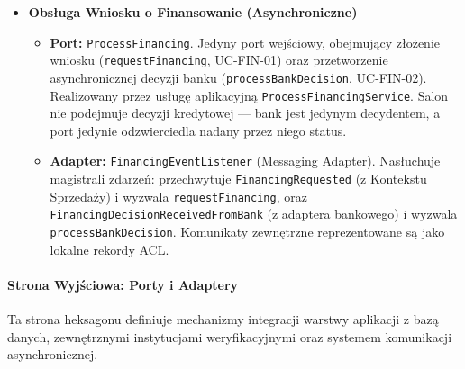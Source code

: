 \begin{itemize}
    \item \textbf{Obsługa Wniosku o Finansowanie (Asynchroniczne)}
    \begin{itemize}
        \item \textbf{Port:} \texttt{ProcessFinancing}. Jedyny port wejściowy, obejmujący złożenie wniosku (\texttt{requestFinancing}, UC-FIN-01) oraz przetworzenie asynchronicznej decyzji banku (\texttt{processBankDecision}, UC-FIN-02). Realizowany przez usługę aplikacyjną \texttt{ProcessFinancingService}. Salon nie podejmuje decyzji kredytowej — bank jest jedynym decydentem, a port jedynie odzwierciedla nadany przez niego status.
        \item \textbf{Adapter:} \texttt{FinancingEventListener} (Messaging Adapter). Nasłuchuje magistrali zdarzeń: przechwytuje \texttt{FinancingRequested} (z Kontekstu Sprzedaży) i wyzwala \texttt{requestFinancing}, oraz \texttt{FinancingDecisionReceivedFromBank} (z adaptera bankowego) i wyzwala \texttt{processBankDecision}. Komunikaty zewnętrzne reprezentowane są jako lokalne rekordy ACL.
    \end{itemize}
\end{itemize}

\paragraph{Strona Wyjściowa: Porty i Adaptery} 
Ta strona heksagonu definiuje mechanizmy integracji warstwy aplikacji z bazą danych, zewnętrznymi instytucjami weryfikacyjnymi oraz systemem komunikacji asynchronicznej.

